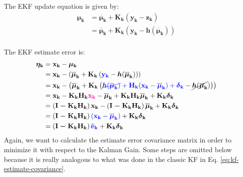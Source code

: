 \documentclass[12pt]{article}
\newcommand{\bvec}[1]{\boldsymbol{\mathbf{#1}}} %
\newcommand{\mat}[1]{\boldsymbol{\mathbf{#1}}}
\newcommand{\parentheses}[1]{\left(#1\right)}
\newcommand{\mb}[1]{{\boldsymbol{#1}}} %
\newcommand{\blue}[1]{\color{blue}#1\color{black}}
\newcommand{\magenta}[1]{\color{magenta}#1\color{black}}
\begin{document}
The EKF update equation is given by:
\begin{equation}
\begin{aligned}
    \bvec{\mu_k} &= \bvec{\overline{\mu}_k} + \mat{K_k}\parentheses{\bvec{y_k} - \bvec{z_k}}\\
    &= \bvec{\overline{\mu}_k} + \mat{K_k}\parentheses{
        \bvec{y_k} - \mb{h}(\bvec{\overline{\mu}_k})}\\
    \label{eq:ekf-update}
\end{aligned}
\end{equation}

The EKF estimate error is:
\begin{equation}
\begin{aligned}
    \bvec{\eta_k} &= \bvec{x_k} - \bvec{\mu_k}\\
    &= \bvec{x_k} - \parentheses{\bvec{\overline{\mu}_k} + 
    \mat{K_k}\parentheses{\blue{\bvec{y_k}}
        - \mb{h}(\bvec{\overline{\mu}_k})}}\\
    &= \bvec{x_k} - \parentheses{\bvec{\overline{\mu}_k} 
    + \mat{K_k}\parentheses{\blue{\cancel{\mb{h}(
        \bvec{\overline{\mu}_k})} + \mat{H_k}(\bvec{x_k} 
        - \bvec{\overline{\mu}_k}) 
        + \mb{\delta}_\mathbf{k}} 
        - \cancel{\mb{h}(\bvec{\overline{\mu}_k}})}}\\
    &= \bvec{x_k} - \mat{K_k H_k} \magenta{\bvec{x_k}}
    - \bvec{\overline{\mu}_k} + \mat{K_k H_k}
    \bvec{\overline{\mu}_k} + \mat{K_k} \mb{\delta}_\mathbf{k}\\
    &= \parentheses{\mat{I - K_k H_k}}\bvec{x_k} 
    -\parentheses{\mat{I - K_k H_k}}\bvec{\overline{\mu}_k}
    + \mat{K_k} \mb{\delta}_\mathbf{k}\\
    &= \parentheses{\mat{I - K_k H_k}} \blue{(\bvec{x_k} 
    - \bvec{\overline{\mu}_k})} 
    + \mat{K_k} \mb{\delta}_\mathbf{k}\\
    &= \parentheses{\mat{I - K_k H_k}} \blue{\bvec{\bar{e}_k}} 
    + \mat{K_k} \mb{\delta}_\mathbf{k}
\end{aligned}
\end{equation}
Again, we want to calculate the estimate error covariance matrix in 
order to minimize it with respect to the Kalman Gain. Some steps are
omitted below because it is really analogous to what was done in the
classic KF in Eq. \ref{eq:kf-estimate-covariance}.
\end{document}
